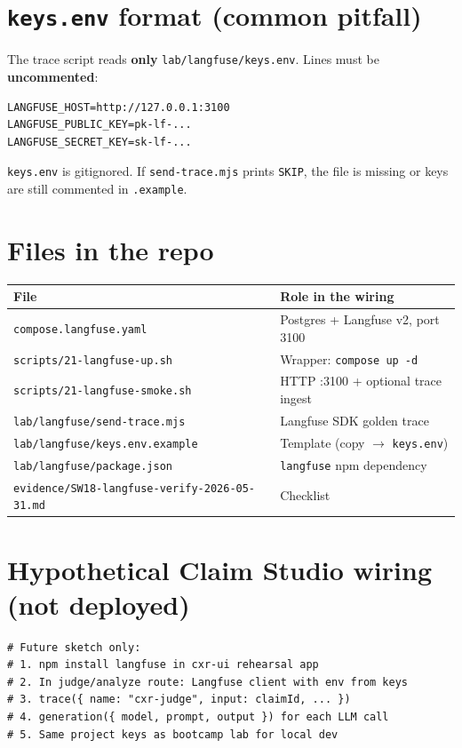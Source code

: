 \documentclass[11pt,a4paper]{report}
\begin{document}
\chapter{\texttt{keys.env} format (common pitfall)}

The trace script reads \textbf{only} \texttt{lab/langfuse/keys.env}. Lines must be \textbf{uncommented}:

\begin{lstlisting}[style=bash]
LANGFUSE_HOST=http://127.0.0.1:3100
LANGFUSE_PUBLIC_KEY=pk-lf-...
LANGFUSE_SECRET_KEY=sk-lf-...
\end{lstlisting}

\texttt{keys.env} is gitignored. If \texttt{send-trace.mjs} prints \texttt{SKIP}, the file is missing or keys are still commented in \texttt{.example}.

\chapter{Files in the repo}

\begin{longtable}{@{}p{5.2cm}p{7.8cm}@{}}
\toprule
File & Role in the wiring \\
\midrule
\endhead
\texttt{compose.langfuse.yaml} & Postgres + Langfuse v2, port 3100 \\
\texttt{scripts/21-langfuse-up.sh} & Wrapper: \texttt{compose up -d} \\
\texttt{scripts/21-langfuse-smoke.sh} & HTTP :3100 + optional trace ingest \\
\texttt{lab/langfuse/send-trace.mjs} & Langfuse SDK golden trace \\
\texttt{lab/langfuse/keys.env.example} & Template (copy $\rightarrow$ \texttt{keys.env}) \\
\texttt{lab/langfuse/package.json} & \texttt{langfuse} npm dependency \\
\texttt{evidence/SW18-langfuse-verify-2026-05-31.md} & Checklist \\
\bottomrule
\end{longtable}

\chapter{Hypothetical Claim Studio wiring (not deployed)}

\begin{lstlisting}[style=bash]
# Future sketch only:
# 1. npm install langfuse in cxr-ui rehearsal app
# 2. In judge/analyze route: Langfuse client with env from keys
# 3. trace({ name: "cxr-judge", input: claimId, ... })
# 4. generation({ model, prompt, output }) for each LLM call
# 5. Same project keys as bootcamp lab for local dev
\end{lstlisting}
\end{document}
